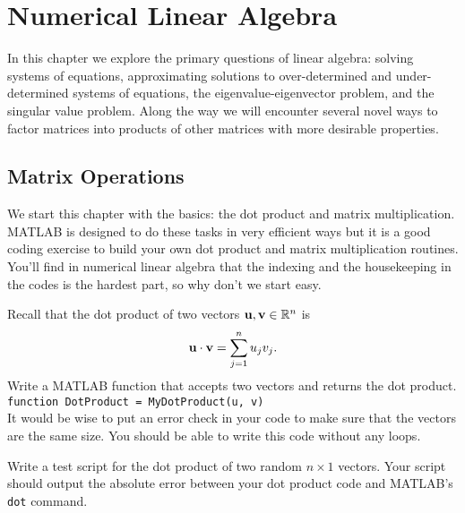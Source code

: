 \chapter{Numerical Linear Algebra}
In this chapter we explore the primary questions of linear algebra: solving systems of
equations, approximating solutions to over-determined and under-determined systems of
equations, the eigenvalue-eigenvector problem, and the singular value problem. Along the
way we will encounter several novel ways to factor matrices into products of other
matrices with more desirable properties.


\section{Matrix Operations}
We start this chapter with the basics: the dot product and matrix multiplication.  MATLAB
is designed to do these tasks in very efficient ways but it is a good coding exercise to
build your own dot product and matrix multiplication routines.  You'll find in numerical
linear algebra that the indexing and the housekeeping in the codes is the hardest part, so
why don't we start easy.

\begin{problem}
    Recall that the dot product of two vectors ${\bf u}, {\bf v} \in \mathbb{R}^n$ is 
    \[ {\bf u} \cdot {\bf v} = \sum_{j=1}^n u_j v_j. \]
    Write a MATLAB function that accepts two vectors and returns the dot product. \\
    \verb|function DotProduct = MyDotProduct(u, v)| \\
    It would be wise to put an error check in your code to make sure that the vectors are
    the same size.  You should be able to write this code without any loops.
\end{problem}

\begin{problem}
    Write a test script for the dot product of two random $n \times 1$ vectors.  Your
    script should output the absolute error between your dot product code and MATLAB's \texttt{dot}
    command.
\end{problem}

